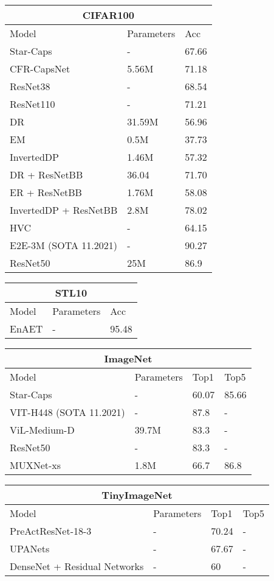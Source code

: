 \documentclass{article}
\begin{document}
\begin{tabular}{lll}
	\hline
	\multicolumn{3}{c}{CIFAR100}\\
	\hline
	Model     & Parameters & Acc \\
	\hline
	Star-Caps &  - & 67.66 \\
	CFR-CapsNet & 5.56M & 71.18 \\
	ResNet38  & - & 68.54 \\
	ResNet110 & - & 71.21 \\
	DR & 31.59M & 56.96 \\
	EM & 0.5M  & 37.73 \\
	InvertedDP & 1.46M & 57.32 \\
	DR + ResNetBB & 36.04 & 71.70 \\
	ER + ResNetBB & 1.76M  & 58.08 \\
	InvertedDP + ResNetBB & 2.8M & 78.02 \\
	HVC & - & 64.15 \\
	E2E-3M (SOTA 11.2021) & - & 90.27 \\
	ResNet50 & 25M & 86.9 \\
	\hline
\end{tabular}

\begin{tabular}{lll}
	\hline
	\multicolumn{3}{c}{STL10}\\
	\hline
	Model     & Parameters & Acc \\
	\hline
	EnAET &  - & 95.48 \\
	\hline
\end{tabular}

\begin{tabular}{llll}
	\hline
	\multicolumn{4}{c}{ImageNet}\\
	\hline
	Model     & Parameters & Top1 & Top5 \\
	\hline
	Star-Caps &  - & 60.07 & 85.66 \\
	VIT-H448 (SOTA 11.2021) & - & 87.8 & - \\
	ViL-Medium-D & 39.7M & 83.3 & - \\
	ResNet50 & - & 83.3 & - \\
	MUXNet-xs & 1.8M & 66.7 & 86.8 \\ 
	
	\hline
\end{tabular}

\begin{tabular}{llll}
	\hline
	\multicolumn{4}{c}{TinyImageNet}\\
	\hline
	Model     & Parameters & Top1 & Top5 \\
	PreActResNet-18-3 & - & 70.24  & - \\
	UPANets & - & 67.67  & - \\
	DenseNet + Residual Networks & - & 60  & - \\
	\hline
	
	
	\hline
\end{tabular}
\end{document}
